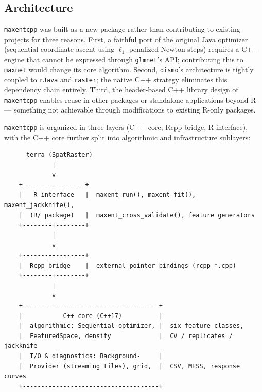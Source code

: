 \documentclass[10pt,letterpaper]{article}
\begin{document}
\subsection*{Architecture}

\texttt{maxentcpp} was built as a new package rather than contributing
to existing projects for three reasons. First, a faithful port of the
original Java optimizer (sequential coordinate ascent using
\(\ell_1\)-penalized Newton steps) requires a C++ engine that cannot be
expressed through \texttt{glmnet}'s API; contributing this to
\texttt{maxnet} would change its core algorithm. Second,
\texttt{dismo}'s architecture is tightly coupled to \texttt{rJava} and
\texttt{raster}; the native C++ strategy eliminates this dependency
chain entirely. Third, the header-based C++ library design of
\texttt{maxentcpp} enables reuse in other packages or standalone
applications beyond R --- something not achievable through modifications
to existing R-only packages.

\texttt{maxentcpp} is organized in three layers (C++ core, Rcpp bridge,
R interface), with the C++ core further split into algorithmic and
infrastructure sublayers:

\begin{verbatim}
      terra (SpatRaster)
             |
             v
    +-----------------+
    |   R interface   |  maxent_run(), maxent_fit(), maxent_jackknife(),
    |  (R/ package)   |  maxent_cross_validate(), feature generators
    +--------+--------+
             |
             v
    +-----------------+
    |  Rcpp bridge    |  external-pointer bindings (rcpp_*.cpp)
    +--------+--------+
             |
             v
    +-------------------------------------+
    |           C++ core (C++17)          |
    |  algorithmic: Sequential optimizer, |  six feature classes,
    |  FeaturedSpace, density             |  CV / replicates / jackknife
    |  I/O & diagnostics: Background-     |
    |  Provider (streaming tiles), grid,  |  CSV, MESS, response curves
    +-------------------------------------+
\end{verbatim}
\end{document}
